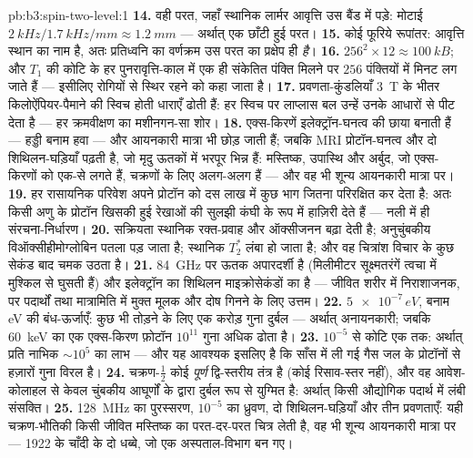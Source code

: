 \begin{solution}{pb:b3:spin-two-level:1}
\textbf{14.} वही परत, जहाँ स्थानिक लार्मर आवृत्ति उस बैंड में पड़े:
मोटाई $\qty{2}{kHz}/\qty{1.7}{kHz/mm} \approx
\qty{1.2}{mm}$ --- अर्थात् एक छाँटी हुई परत।
\textbf{15.} कोई फूरिये रूपांतर: आवृत्ति स्थान का नाम है, अतः
प्रतिध्वनि का वर्णक्रम उस परत का प्रक्षेप ही \emph{है}।
\textbf{16.} $256^2 \times 12 \approx \qty{100}{kB}$; और $T_1$ की
कोटि के हर पुनरावृत्ति-काल में एक ही संकेतित पंक्ति मिलने पर $256$
पंक्तियों में मिनट लग जाते हैं --- इसीलिए रोगियों से स्थिर रहने को
कहा जाता है।
\textbf{17.} प्रवणता-कुंडलियाँ \qty{3}{T} के भीतर किलोऐंपियर-पैमाने
की स्विच होती धाराएँ ढोती हैं: हर स्विच पर लाप्लास बल उन्हें उनके
आधारों से पीट देता है --- हर क्रमवीक्षण का मशीनगन-सा शोर।
\textbf{18.} एक्स-किरणें इलेक्ट्रॉन-घनत्व की छाया बनाती हैं --- हड्डी
बनाम हवा --- और आयनकारी मात्रा भी छोड़ जाती हैं; जबकि MRI प्रोटॉन-घनत्व
और दो शिथिलन-घड़ियाँ पढ़ती है, जो मृदु ऊतकों में भरपूर भिन्न हैं:
मस्तिष्क, उपास्थि और अर्बुद, जो एक्स-किरणों को एक-से लगते हैं,
चक्रणों के लिए अलग-अलग हैं --- और वह भी शून्य आयनकारी मात्रा पर।
\textbf{19.} हर रासायनिक परिवेश अपने प्रोटॉन को दस लाख में कुछ भाग
जितना परिरक्षित कर देता है: अतः किसी अणु के प्रोटॉन खिसकी हुई रेखाओं
की सुलझी कंघी के रूप में हाज़िरी देते हैं --- नली में ही संरचना-निर्धारण।
\textbf{20.} सक्रियता स्थानिक रक्त-प्रवाह और ऑक्सीजनन बढ़ा देती है;
अनुचुंबकीय विऑक्सीहीमोग्लोबिन पतला पड़ जाता है; स्थानिक $T_2^*$ लंबा
हो जाता है; और वह चित्रांश विचार के कुछ सेकंड बाद चमक उठता है।
\textbf{21.} \qty{84}{GHz} पर ऊतक अपारदर्शी है (मिलीमीटर
सूक्ष्मतरंगें त्वचा में मुश्किल से घुसती हैं) और इलेक्ट्रॉन का शिथिलन
माइक्रोसेकंडों का है --- जीवित शरीर में निराशाजनक, पर पदार्थों तथा
मात्रामिति में मुक्त मूलक और दोष गिनने के लिए उत्तम।
\textbf{22.} $\num{5e-7}\,\unit{eV}$, बनाम eV की बंध-ऊर्जाएँ: कुछ
भी तोड़ने के लिए एक करोड़ गुना दुर्बल --- अर्थात् अनायनकारी; जबकि
\qty{60}{keV} का एक एक्स-किरण फ़ोटॉन $10^{11}$ गुना अधिक ढोता है।
\textbf{23.} $10^{-5}$ से कोटि एक तक: अर्थात् प्रति नाभिक
$\sim10^5$ का लाभ --- और यह आवश्यक इसलिए है कि साँस में ली गई गैस जल
के प्रोटॉनों से हज़ारों गुना विरल है।
\textbf{24.} चक्रण-$\tfrac12$ कोई \emph{पूर्ण} द्वि-स्तरीय
तंत्र है (कोई रिसाव-स्तर नहीं), और वह आवेश-कोलाहल से केवल
चुंबकीय आघूर्णों के द्वारा दुर्बल रूप से युग्मित है: अर्थात् किसी
औद्योगिक पदार्थ में लंबी संसक्ति।
\textbf{25.} \qty{128}{MHz} का पुरस्सरण, $10^{-5}$ का
ध्रुवण, दो शिथिलन-घड़ियाँ और तीन प्रवणताएँ: यही चक्रण-भौतिकी किसी
जीवित मस्तिष्क का परत-दर-परत चित्र लेती है, वह भी शून्य
आयनकारी मात्रा पर --- 1922 के चाँदी के दो धब्बे, जो एक अस्पताल-विभाग
बन गए।
\end{solution}
